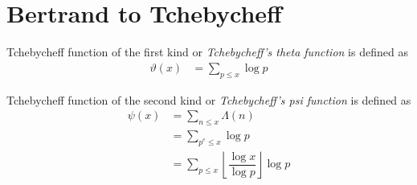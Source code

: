 \documentclass[elemannt.tex]{subfile}
\begin{document}
	\chapter{Bertrand to Tchebycheff}
		\begin{definition}
			Tchebycheff function of the first kind or \textit{Tchebycheff's theta function} is defined as
				\begin{align*}
					\vartheta(x)
						& = \sum_{p\leq x}\log{p}
				\end{align*}
		\end{definition}
	
		\begin{definition}
			Tchebycheff function of the second kind or \textit{Tchebycheff's psi function} is defined as
				\begin{align*}
					\psi(x)
						& = \sum_{n\leq x}\Lambda(n)\\
						& = \sum_{p^{e}\leq x}\log{p}\\
						& = \sum_{p\leq x}\left\lfloor{\dfrac{\log{x}}{\log{p}}}\right\rfloor \log{p}
				\end{align*}
		\end{definition}
\end{document}
